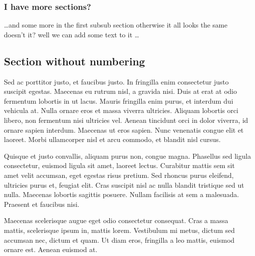 \documentclass[11pt,times]{article}
\begin{document}
\subsubsection{I have more sections?} %
\dots and some more in the first subsub section otherwise it all looks the same
doesn't it? well we can add some text to it \dots

\subsection*{Section without numbering} %

Sed ac porttitor justo, et faucibus justo. In fringilla enim consectetur justo 
suscipit egestas. Maecenas eu rutrum nisl, a gravida nisi. Duis at erat at odio 
fermentum lobortis in ut lacus. Mauris fringilla enim purus, et interdum dui 
vehicula at. Nulla ornare eros et massa viverra ultricies. Aliquam lobortis 
orci libero, non fermentum nisi ultricies vel. Aenean tincidunt orci in dolor 
viverra, id ornare sapien interdum. Maecenas ut eros sapien. Nunc venenatis 
congue elit et laoreet. Morbi ullamcorper nisl et arcu commodo, et blandit nisl 
cursus.

Quisque et justo convallis, aliquam purus non, congue magna. Phasellus sed 
ligula consectetur, euismod ligula sit amet, laoreet lectus. Curabitur mattis 
sem sit amet velit accumsan, eget egestas risus pretium. Sed rhoncus purus 
eleifend, ultricies purus et, feugiat elit. Cras suscipit nisl ac nulla blandit 
tristique sed ut nulla. Maecenas lobortis sagittis posuere. Nullam facilisis at 
sem a malesuada. Praesent et faucibus nisi.

Maecenas scelerisque augue eget odio consectetur consequat. Cras a massa 
mattis, scelerisque ipsum in, mattis lorem. Vestibulum mi metus, dictum sed 
accumsan nec, dictum et quam. Ut diam eros, fringilla a leo mattis, euismod 
ornare est. Aenean euismod at. 
\end{document}

